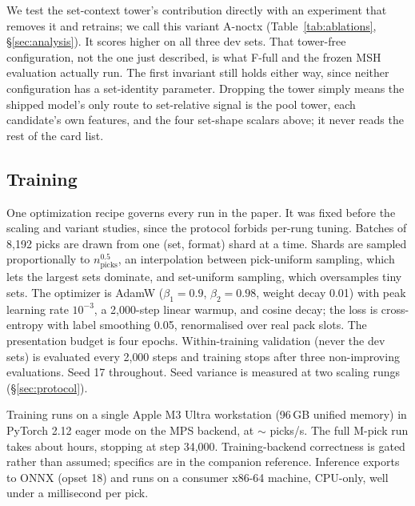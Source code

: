We test the set-context tower's contribution directly with an experiment
that removes it and retrains; we call this variant A-noctx
(Table~\ref{tab:ablations}, \S\ref{sec:analysis}). It scores higher on all
three dev sets. That tower-free configuration, not the one just described,
is what F-full and the frozen MSH evaluation actually run. The first invariant still holds
either way, since neither configuration has a set-identity parameter.
Dropping the tower simply means the shipped model's only route to
set-relative signal is the pool tower, each candidate's own features, and
the four set-shape scalars above; it never reads the rest of the card
list.

\subsection{Training}
\label{sec:training}

One optimization recipe governs every run in the paper. It was fixed before the
scaling and variant studies, since the protocol forbids per-rung tuning.
Batches of 8{,}192 picks are drawn from one (set, format) shard at a
time. Shards are sampled proportionally to $n_{\text{picks}}^{0.5}$, an
interpolation between pick-uniform sampling, which lets the largest sets
dominate, and set-uniform sampling, which oversamples tiny sets. The
optimizer is AdamW ($\beta_1{=}0.9$, $\beta_2{=}0.98$, weight decay 0.01)
with peak learning rate $10^{-3}$, a 2{,}000-step linear warmup, and
cosine decay; the loss is cross-entropy with label smoothing 0.05,
renormalised over real pack slots. The presentation budget
is four epochs. Within-training validation (never the dev sets) is
evaluated every 2{,}000 steps and training stops after three
non-improving evaluations. Seed 17 throughout. Seed variance is measured
at two scaling rungs (\S\ref{sec:protocol}).

Training runs on a single Apple M3 Ultra workstation (96\,GB unified
memory) in PyTorch 2.12 eager mode on the MPS backend, at
$\sim$\FdevExamplesPerSec{} picks/s. The full \FdevPicks M-pick run takes
about \FdevWallHours{} hours, stopping at step 34{,}000. Training-backend
correctness is gated rather than assumed; specifics are in the companion
reference. Inference exports to ONNX (opset 18) and runs on a consumer
x86-64 machine, CPU-only, well under a millisecond per pick.
